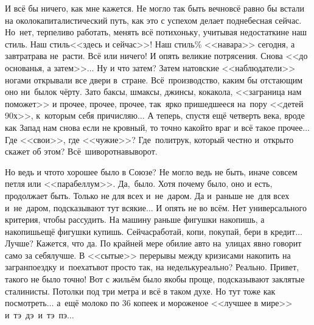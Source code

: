 И всё бы ничего, как мне кажется. Не могло так быть вечно\mdash всё равно бы встали на околокапиталистический путь, как это с успехом делает поднебесная сейчас. Но~нет, терпеливо работать, менять всё потихоньку, учитывая недостатки\mdash не наш стиль. Наш стиль\mdash <<здесь и сейчас>>! Наш стиль\% <<навара>> сегодня, а завтра\mdash трава не~расти. Всё или ничего! И опять великие потрясения. Снова <<до основанья, а затем>>$\ldots$ Ну и что затем? Затем натовские <<наблюдатели>> ногами открывали все двери в~стране. Всё~производство, каким бы отстающим оно ни~было\mdash к чёрту. Зато баксы, шмаксы, джинсы, кока\sdash кола, <<заграница нам поможет>> и прочее, прочее, прочее, так~ярко пришедшееся на~пору <<детей 90\sdash х>>, к~которым себя причисляю$\ldots$ А теперь, спустя ещё четверть века, вроде как Запад нам снова если не кровный, то точно какой\sdash то враг и всё такое прочее$\ldots$ Где <<свои>>, где <<чужие>>? Где~политрук, который честно и~открыто скажет об этом? Всё~шиворот\sdash навыворот.

Но ведь и что\sdash то хорошее было в Союзе? Не могло ведь не быть, иначе совсем петля или <<парабеллум>>. Да,~было. Хотя почему было, оно и есть, продолжает быть. Только не для всех и~не~даром. Да и~раньше не~для всех и~не~даром, подсказывают тут всякие$\ldots$
И опять не во всём. Нет универсального критерия, чтобы рассудить. На машину раньше фигушки накопишь, а накопишь\mdash ещё фигушки купишь. Сейчас\mdash работай, копи, покупай, бери в кредит$\ldots$ Лучше? Кажется, что да. По крайней мере обилие авто на~улицах явно говорит само за себя\mdash лучше. В <<сытые>> перерывы между кризисами накопить на загранпоездку и~поехать\mdash вот просто так, на недельку\mdash реально? Реально. Привет, такого не было точно! 
Вот с жильём было якобы проще, подсказывают заклятые сталинисты. Потолки под три метра и всё в таком духе. Но тут тоже как посмотреть$\ldots$ а~ещё молоко по 36 копеек и мороженое <<лучшее в мире>> и~тэ~дэ~и~тэ~пэ$\ldots$ 

